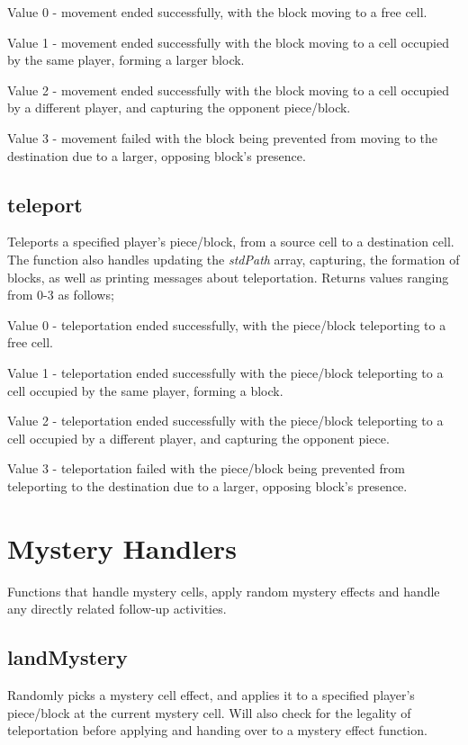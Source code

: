 \documentclass{article}
\begin{document}
Value 0 - movement ended successfully, with the block moving to a free cell. 

Value 1 - movement ended successfully with the block moving to a cell occupied by the same player, forming a larger block.

Value 2 - movement ended successfully with the block moving to a cell occupied by a different player, and capturing the opponent piece/block.

Value 3 - movement failed with the block being prevented from moving to the destination due to a larger, opposing block's presence.

\subsection{teleport}
Teleports a specified player's piece/block, from a source cell to a destination cell. The function also handles updating the \textit{stdPath} array, capturing, the formation of blocks, as well as printing messages about teleportation. Returns values ranging from 0-3 as follows;

Value 0 - teleportation ended successfully, with the piece/block teleporting to a free cell. 

Value 1 - teleportation ended successfully with the piece/block teleporting to a cell occupied by the same player, forming a block.

Value 2 - teleportation ended successfully with the piece/block teleporting to a cell occupied by a different player, and capturing the opponent piece.

Value 3 - teleportation failed with the piece/block being prevented from teleporting to the destination due to a larger, opposing block's presence.

\section{Mystery Handlers}
Functions that handle mystery cells, apply random mystery effects and handle any directly related follow-up activities.

\subsection{landMystery}
Randomly picks a mystery cell effect, and applies it to a specified player's piece/block at the current mystery cell. Will also check for the legality of teleportation before applying and handing over to a mystery effect function.
\end{document}
